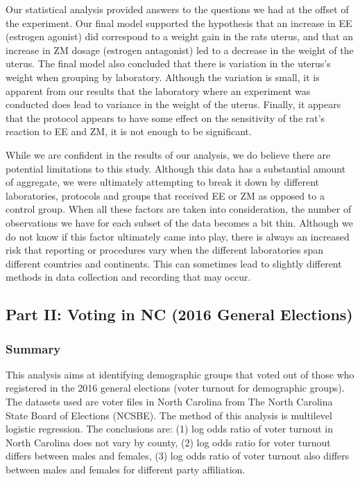 \documentclass[
]{article}
\begin{document}
Our statistical analysis provided answers to the questions we had at the
offset of the experiment. Our final model supported the hypothesis that
an increase in EE (estrogen agonist) did correspond to a weight gain in
the rats uterus, and that an increase in ZM dosage (estrogen antagonist)
led to a decrease in the weight of the uterus. The final model also
concluded that there is variation in the uterus's weight when grouping
by laboratory. Although the variation is small, it is apparent from our
results that the laboratory where an experiment was conducted does lead
to variance in the weight of the uterus. Finally, it appears that the
protocol appears to have some effect on the sensitivity of the rat's
reaction to EE and ZM, it is not enough to be significant.

While we are confident in the results of our analysis, we do believe
there are potential limitations to this study. Although this data has a
substantial amount of aggregate, we were ultimately attempting to break
it down by different laboratories, protocols and groups that received EE
or ZM as opposed to a control group. When all these factors are taken
into consideration, the number of observations we have for each subset
of the data becomes a bit thin. Although we do not know if this factor
ultimately came into play, there is always an increased risk that
reporting or procedures vary when the different laboratories span
different countries and continents. This can sometimes lead to slightly
different methods in data collection and recording that may occur.

\hypertarget{part-ii-voting-in-nc-2016-general-elections}{%
\subsection{Part II: Voting in NC (2016 General
Elections)}\label{part-ii-voting-in-nc-2016-general-elections}}

\hypertarget{summary-1}{%
\subsubsection{Summary}\label{summary-1}}

This analysis aims at identifying demographic groups that voted out of
those who registered in the 2016 general elections (voter turnout for
demographic groups). The datasets used are voter files in North Carolina
from The North Carolina State Board of Elections (NCSBE). The method of
this analysis is multilevel logistic regression. The conclusions are:
(1) log odds ratio of voter turnout in North Carolina does not vary by
county, (2) log odds ratio for voter turnout differs between males and
females, (3) log odds ratio of voter turnout also differs between males
and females for different party affiliation.
\end{document}
